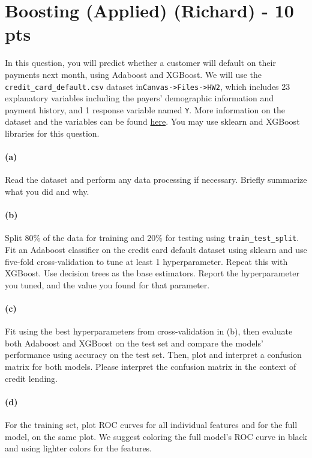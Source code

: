 \documentclass{exam}
\begin{document}
\newpage

\section{Boosting (Applied) (Richard) - 10 pts}

In this question, you will predict whether a customer will default on their payments next month, using Adaboost and XGBoost. We will use the \texttt{credit\_card\_default.csv}  dataset in\texttt{Canvas->Files->HW2}, which includes 23 explanatory variables including the payers' demographic information and payment history, and 1 response variable named \texttt{Y}. More information on the dataset and the variables can be found \href{https://archive.ics.uci.edu/dataset/350/default+of+credit+card+clients}{here}. You may use sklearn and XGBoost libraries for this question. 


\paragraph{(a)} Read the dataset and perform any data processing if necessary. Briefly summarize what you did and why.

\paragraph{(b)} Split 80\% of the data for training and 20\% for testing using \texttt{train\_test\_split}. Fit an Adaboost classifier on the credit card default dataset using sklearn and use five-fold cross-validation to tune at least 1 hyperparameter. Repeat this with XGBoost. Use decision trees as the base estimators. Report the hyperparameter you tuned, and the value you found for that parameter. 

\paragraph{(c)} Fit using the best hyperparameters from cross-validation in (b), then evaluate both Adaboost and XGBoost on the test set and compare the models' performance using accuracy on the test set. Then, plot and interpret a confusion matrix for both models. Please interpret the confusion matrix in the context of credit lending.

\paragraph{(d)} For the training set, plot ROC curves for all individual features and for the full model, on the same plot. We suggest coloring the full model's ROC curve in black and using lighter colors for the features.
\end{document}
